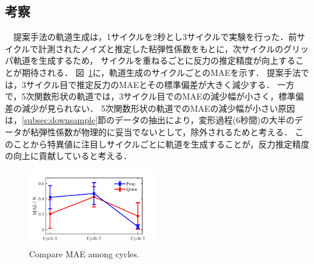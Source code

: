\documentclass[a4paper]{jarticle}
\begin{document}
\subsection{考察}
　提案手法の軌道生成は，1サイクルを2秒とし3サイクルで実験を行った．前サイクルで計測されたノイズと推定した粘弾性係数をもとに，次サイクルのグリッパ軌道を生成するため，
サイクルを重ねるごとに反力の推定精度が向上することが期待される．
{\color{blue}
図~\ref{fig:compare_cycle_MAE}に，軌道生成のサイクルごとのMAEを示す．
提案手法では，3サイクル目で推定反力のMAEとその標準偏差が大きく減少する．
一方で，5次関数形状の軌道では，3サイクル目でのMAEの減少幅が小さく，標準偏差の減少が見られない．
5次関数形状の軌道でのMAEの減少幅が小さい原因は，\ref{subsec:downsample}節のデータの抽出により，変形過程(6秒間)の大半のデータが粘弾性係数が物理的に妥当でないとして，除外されるためと考える．
このことから特異値に注目しサイクルごとに軌道を生成することが，反力推定精度の向上に貢献していると考える．
}
\begin{figure}[t]
    \centering
    \includegraphics[width=0.5\textwidth]{chikencompare_cycle_MAE.pdf}
    \caption{Compare MAE among cycles.}
    \label{fig:compare_cycle_MAE}
\end{figure}
\end{document}
